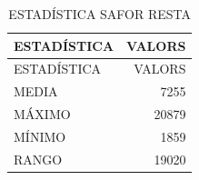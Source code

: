\documentclass[
]{article}
\begin{document}
\begin{longtable}[]{@{}lr@{}}
\caption{ESTADÍSTICA SAFOR RESTA}\tabularnewline
\toprule\noalign{}
ESTADÍSTICA & VALORS \\
\midrule\noalign{}
\endfirsthead
\toprule\noalign{}
ESTADÍSTICA & VALORS \\
\midrule\noalign{}
\endhead
\bottomrule\noalign{}
\endlastfoot
MEDIA & 7255 \\
MÁXIMO & 20879 \\
MÍNIMO & 1859 \\
RANGO & 19020 \\
\end{longtable}
\end{document}

